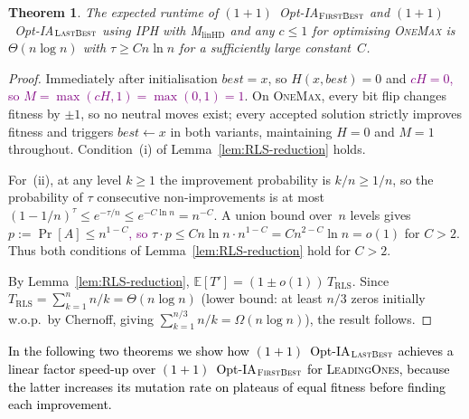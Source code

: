 \documentclass[lettersize,journal]{IEEEtran}
\newcommand{\new}[1]{\textcolor{black}{#1}}
\newcommand{\rerev}[1]{\textcolor{purple}{#1}}
\newcommand{\EE}{\mathbb{E}}
\newcommand{\linHD}{M$_{\text{linHD}}$}
\newcommand{\IPHfcm}{IPH}
\newcommand{\firstBest}{$(1+1)$~Opt-IA$_{\textsc{FirstBest}}$}
\newcommand{\lastBest}{$(1+1)$~Opt-IA$_{\textsc{LastBest}}$}
\newtheorem{theorem}{Theorem}
\begin{document}
\begin{theorem}\label{thm:onemaxexpo}
The expected runtime of \firstBest{} and \lastBest{} using \IPHfcm{} with
\linHD{} and any $c\leq 1$ for optimising \textsc{OneMax} is $\Theta(n\log n)$
with $\tau\geq Cn\ln n$ for a sufficiently large constant~$C$.
\end{theorem}
\begin{proof}
Immediately after initialisation $\mathit{best}=x$, so $H(x,\mathit{best})=0$
and \rerev{$cH=0$, so $M=\max(cH,1)=\max(0,1)=1$}.
On \textsc{OneMax}, every bit flip changes fitness by $\pm 1$, so no neutral
moves exist; every accepted solution strictly improves fitness and triggers
$\mathit{best}\leftarrow x$ in both variants, maintaining $H=0$ and $M=1$
throughout.  Condition~(i) of Lemma~\ref{lem:RLS-reduction} holds.

For~(ii), at any level $k\geq 1$ the improvement probability is $k/n\geq 1/n$,
so the probability of $\tau$ consecutive non-improvements is at most
$(1-1/n)^\tau\leq e^{-\tau/n}\leq e^{-C\ln n}=n^{-C}$.
A union bound over~$n$ levels gives $p:=\Pr[A]\leq n^{1-C}$\rerev{, so}
$\tau\cdot p\leq Cn\ln n\cdot n^{1-C}=Cn^{2-C}\ln n=o(1)$ for $C>2$.
Thus both conditions of Lemma~\ref{lem:RLS-reduction} hold for $C>2$.

By Lemma~\ref{lem:RLS-reduction},
$\EE[T']=(1\pm o(1))\,T_{\mathrm{RLS}}$.
Since $T_{\mathrm{RLS}}=\sum_{k=1}^{n}n/k=\Theta(n\log n)$ (lower bound: at
least $n/3$ zeros initially w.o.p.\ by Chernoff, giving
$\sum_{k=1}^{n/3}n/k=\Omega(n\log n)$), the result follows.
\end{proof}



\new{In the following two theorems we show how \lastBest{} achieves a linear
factor speed-up over \firstBest{} for \textsc{LeadingOnes}, because the latter
increases its mutation rate on plateaus of equal fitness before finding each
improvement.}
\end{document}
